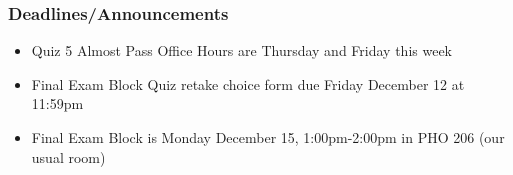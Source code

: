 
\begin{frame}
    \frametitle{Deadlines/Announcements}
\begin{itemize}
            \item Quiz 5 Almost Pass Office Hours are Thursday and Friday this week
            \item Final Exam Block Quiz retake choice form due Friday December 12 at 11:59pm
            \item Final Exam Block is Monday December 15, 1:00pm-2:00pm in PHO 206 (our usual room)
        \end{itemize}
\end{frame}
